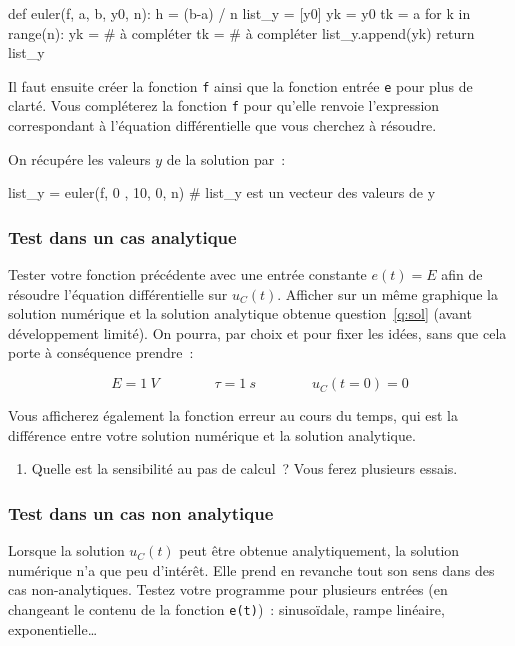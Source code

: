 \documentclass[../main/main.tex]{subfiles}
\begin{document}
\begin{python}
def euler(f, a, b, y0, n):
  h = (b-a) / n
  list_y = [y0]
  yk = y0
  tk = a
  for k in range(n):
    yk = # à compléter
    tk = # à compléter
    list_y.append(yk)
  return list_y
\end{python}

Il faut ensuite créer la fonction \texttt{f} ainsi que la fonction entrée
\texttt{e} pour plus de clarté. Vous compléterez la fonction \texttt{f} pour
qu'elle renvoie l'expression correspondant à l'équation différentielle que vous
cherchez à résoudre.

%
%

On récupére les valeurs $y$ de la solution par~:
\begin{python}
list_y = euler(f, 0 , 10, 0, n) # list_y est un vecteur des valeurs de y
\end{python}

\subsubsection{Test dans un cas analytique}

Tester votre fonction précédente avec une entrée constante $e(t) = E$ afin de
résoudre l'équation différentielle sur $u_{C}(t)$. Afficher sur un même
graphique la solution numérique et la solution analytique obtenue
question~\ref{q:sol} (avant développement limité). On pourra, par choix et pour
fixer les idées, sans que cela porte à conséquence prendre~:

\[
  E = \SI{1}{V}
  \qquad \qquad
  \tau = \SI{1}{s}
  \qquad \qquad
  u_{C}(t=0) = 0
\]

Vous afficherez également la fonction erreur au cours du temps, qui est la
différence entre votre solution numérique et la solution analytique.
\begin{enumerate}[label=\sqenumi, start=12]
  \item Quelle est la sensibilité au pas de calcul~? Vous ferez plusieurs
    essais.
\end{enumerate}


\subsubsection{Test dans un cas non analytique}

Lorsque la solution $u_{C}(t)$ peut être obtenue analytiquement, la solution
numérique n'a que peu d'intérêt. Elle prend en revanche tout son sens dans des
cas non-analytiques.
\smallbreak
Testez votre programme pour plusieurs entrées (en changeant le contenu de la
fonction \texttt{e(t)})~: sinusoïdale, rampe linéaire, exponentielle…
\end{document}
